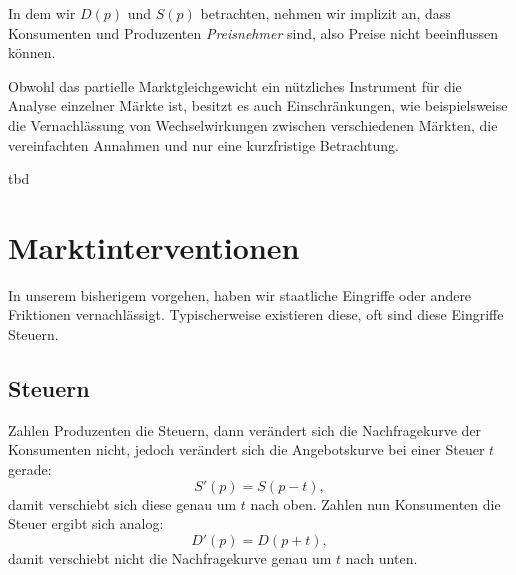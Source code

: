 

\begin{remark}
    In dem wir $D(p)$ und $S(p)$ betrachten, nehmen wir implizit an, dass Konsumenten und Produzenten \emph{Preisnehmer} sind, also Preise nicht beeinflussen können.  
\end{remark}



Obwohl das partielle Marktgleichgewicht ein nützliches Instrument für die Analyse einzelner Märkte ist, besitzt es auch Einschränkungen, wie beispielsweise die Vernachlässung von Wechselwirkungen zwischen verschiedenen Märkten, die vereinfachten Annahmen und nur eine kurzfristige Betrachtung. 

\begin{example}[Feuer]
tbd
\end{example}


\section{Marktinterventionen}



In unserem bisherigem vorgehen, haben wir staatliche Eingriffe oder andere Friktionen vernachlässigt.
Typischerweise existieren diese, oft sind diese Eingriffe Steuern.

\subsection{Steuern}

Zahlen Produzenten die Steuern, dann verändert sich die Nachfragekurve der Konsumenten nicht, jedoch verändert sich die Angebotskurve bei einer Steuer $t$ gerade:
\[
S'(p) = S(p-t)
,\]
damit verschiebt sich diese genau um $t$ nach oben. 
Zahlen nun Konsumenten die Steuer ergibt sich analog:
\[
D'(p) = D(p+t)
,\]
damit verschiebt nicht die Nachfragekurve genau um $t$ nach unten.

